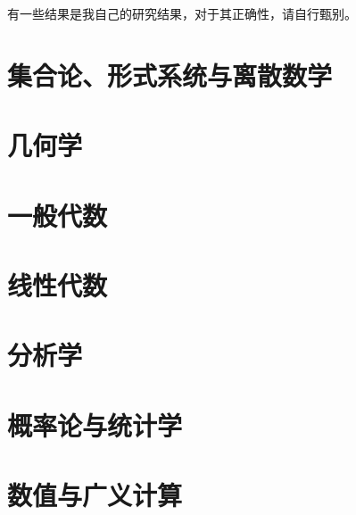 \documentclass[nofontspec, cn,11pt,dvipsnames,green,cite=numbers,bibstyle=gb7714-2015,T4]{elegantbook}
\begin{document}
有一些结果是我自己的研究结果，对于其正确性，请自行甄别。
\part{集合论、形式系统与离散数学}






%

\part{几何学}







\part{一般代数}









\part{线性代数}\label{linear-algebra-part}






\part{分析学}













\part{概率论与统计学}









%


\part{数值与广义计算}










\end{document}
